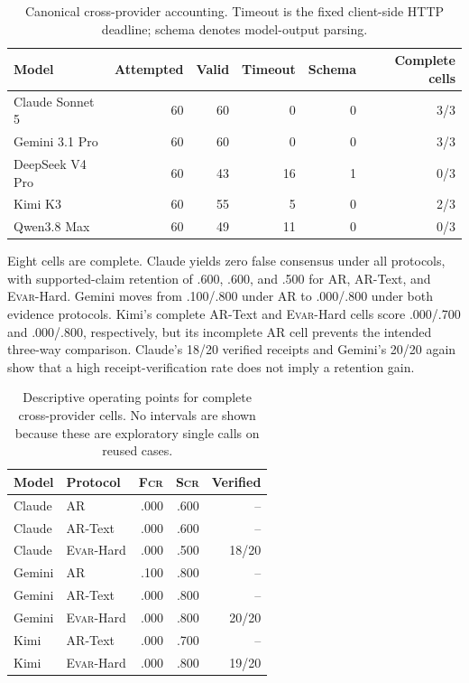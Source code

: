 \documentclass[acmsmall,screen,review,anonymous]{acmart}
\newcommand{\evar}{\textsc{Evar}\xspace}
\newcommand{\fcr}{\textsc{Fcr}\xspace}
\newcommand{\scr}{\textsc{Scr}\xspace}
\begin{document}
\begin{table}[h]
\centering
\caption{Canonical cross-provider accounting. Timeout is the fixed client-side HTTP deadline; schema denotes model-output parsing.}
\label{tab:cross-provider-accounting}
\small
\begin{tabular}{@{}lrrrrr@{}}
\toprule
Model & Attempted & Valid & Timeout & Schema & Complete cells \\
\midrule
Claude Sonnet 5 & 60 & 60 & 0 & 0 & 3/3 \\
Gemini 3.1 Pro & 60 & 60 & 0 & 0 & 3/3 \\
DeepSeek V4 Pro & 60 & 43 & 16 & 1 & 0/3 \\
Kimi K3 & 60 & 55 & 5 & 0 & 2/3 \\
Qwen3.8 Max & 60 & 49 & 11 & 0 & 0/3 \\
\bottomrule
\end{tabular}
\end{table}

Eight cells are complete. Claude yields zero false consensus under all protocols, with supported-claim retention of .600, .600, and .500 for AR, AR-Text, and \evar-Hard. Gemini moves from .100/.800 under AR to .000/.800 under both evidence protocols. Kimi's complete AR-Text and \evar-Hard cells score .000/.700 and .000/.800, respectively, but its incomplete AR cell prevents the intended three-way comparison. Claude's 18/20 verified receipts and Gemini's 20/20 again show that a high receipt-verification rate does not imply a retention gain.

\begin{table}[h]
\centering
\caption{Descriptive operating points for complete cross-provider cells. No intervals are shown because these are exploratory single calls on reused cases.}
\label{tab:cross-provider-quality}
\small
\begin{tabular}{@{}llrrr@{}}
\toprule
Model & Protocol & \fcr & \scr & Verified \\
\midrule
Claude & AR & .000 & .600 & -- \\
Claude & AR-Text & .000 & .600 & -- \\
Claude & \evar-Hard & .000 & .500 & 18/20 \\
Gemini & AR & .100 & .800 & -- \\
Gemini & AR-Text & .000 & .800 & -- \\
Gemini & \evar-Hard & .000 & .800 & 20/20 \\
Kimi & AR-Text & .000 & .700 & -- \\
Kimi & \evar-Hard & .000 & .800 & 19/20 \\
\bottomrule
\end{tabular}
\end{table}
\end{document}
